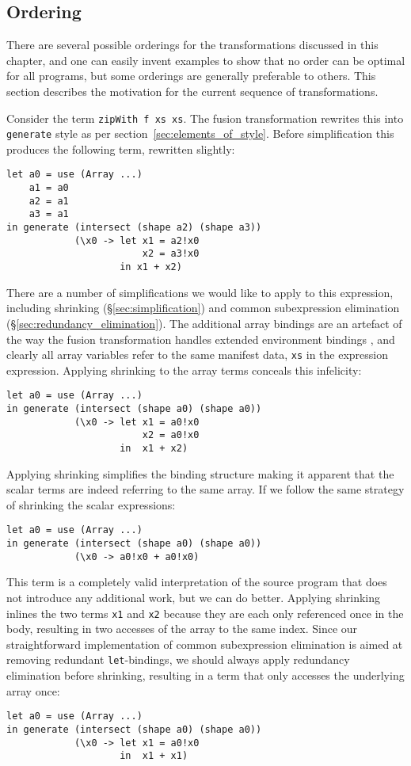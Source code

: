 \subsection{Ordering}

There are several possible orderings for the transformations discussed in this
chapter, and one can easily invent examples to show that no order can be optimal
for all programs, but some orderings are generally preferable to others. This
section describes the motivation for the current sequence of transformations.

Consider the term \lstinline[style=inline]{zipWith f xs xs}. The fusion
transformation rewrites this into \texttt{generate} style as per
section~\ref{sec:elements_of_style}. Before simplification this produces the
following term, rewritten slightly:
%
\begin{lstlisting}[style=haskell]
let a0 = use (Array ...)
    a1 = a0
    a2 = a1
    a3 = a1
in generate (intersect (shape a2) (shape a3))
            (\x0 -> let x1 = a2!x0
                        x2 = a3!x0
                    in x1 + x2)
\end{lstlisting}
%
There are a number of simplifications we would like to apply to this expression,
including shrinking (\S\ref{sec:simplification}) and common subexpression
elimination (\S\ref{sec:redundancy_elimination}). The additional array bindings
are an artefact of the way the fusion transformation handles extended
environment bindings ,
and clearly all array variables refer to the same manifest data, \texttt{xs} in
the expression expression. Applying shrinking to the array terms conceals this
infelicity:
%
\begin{lstlisting}[style=haskell]
let a0 = use (Array ...)
in generate (intersect (shape a0) (shape a0))
            (\x0 -> let x1 = a0!x0
                        x2 = a0!x0
                    in  x1 + x2)
\end{lstlisting}
%
Applying shrinking simplifies the binding structure making it apparent that the
scalar terms are indeed referring to the same array. If we follow the same
strategy of shrinking the scalar expressions:
%
\begin{lstlisting}[style=haskell]
let a0 = use (Array ...)
in generate (intersect (shape a0) (shape a0))
            (\x0 -> a0!x0 + a0!x0)
\end{lstlisting}
%
This term is a completely valid interpretation of the source program that does
not introduce any additional work, but we can do better. Applying shrinking
inlines the two terms \texttt{x1} and \texttt{x2} because they are each only
referenced once in the body, resulting in two accesses of the array to the same
index. Since our straightforward implementation of common subexpression
elimination is aimed at removing redundant \texttt{let}-bindings, we should
always apply redundancy elimination before shrinking, resulting in a term that
only accesses the underlying array once:
%
\begin{lstlisting}[style=haskell]
let a0 = use (Array ...)
in generate (intersect (shape a0) (shape a0))
            (\x0 -> let x1 = a0!x0
                    in  x1 + x1)
\end{lstlisting}

